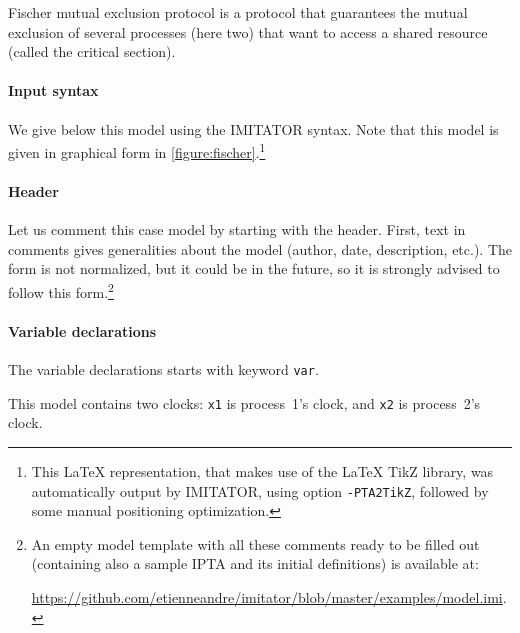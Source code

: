 \documentclass[a4paper,11pt]{report}
\newcommand{\imitator}{\textsf{IMITATOR}}
\newcommand{\IPTA}{IPTA}
\newcommand{\styleIMI}[1]{\textcolor{imicolor}{\texttt{#1}}}
\newcommand{\styleOption}[1]{\textcolor{optioncolor}{\texttt{#1}}}
\newcommand{\IncludeIMIfile}[1]{
	\lstset{language=Imitator}
	
}
\begin{document}
Fischer mutual exclusion protocol is a protocol that guarantees the mutual exclusion of several processes (here two) that want to access a shared resource (called the critical section).
% 

\paragraph{Input syntax}
We give below this model using the \imitator{} syntax.
Note that this model is given in graphical form in \cref{figure:fischer}.\footnote{%
	This \LaTeX{} representation, that makes use of the \LaTeX{} TikZ library, was automatically output by \imitator{}, using option \styleOption{-PTA2TikZ}, followed by some manual positioning optimization.
}

\bigskip

\IncludeIMIfile{include/fischerPAT_obs.imi}




\paragraph{Header}
Let us comment this case model by starting with the header.
First, text in comments gives generalities about the model (author, date, description, etc.).
The form is not normalized, but it could be in the future, so it is strongly advised to follow this form.\footnote{%
	An empty model template with all these comments ready to be filled out (containing also a sample \IPTA{} and its initial definitions) is available at:
	
	\url{https://github.com/etienneandre/imitator/blob/master/examples/model.imi}.
}

\paragraph{Variable declarations}
The variable declarations starts with keyword \styleIMI{var}.

This model contains two clocks: \styleIMI{x1} is process~1's clock, and \styleIMI{x2} is process~2's clock.
\end{document}
